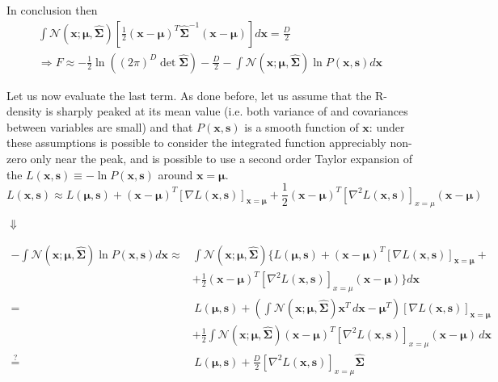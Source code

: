 \documentclass[a4paper, 10pt]{article}
\begin{document}
In conclusion then
\begin{gather}
\int \mathcal{N}(\mathbf x; \bm \mu, \bm{\hat{\Sigma}}) \left[ \frac{1}{2} (\mathbf x-\boldsymbol \mu)^T \boldsymbol{\hat{\Sigma}}^{-1} (\mathbf x-\boldsymbol \mu) \right] d \mathbf x = \frac{D}{2} \\
\Rightarrow F \approx -\frac{1}{2} \ln \left( (2 \pi)^{D} \det \bm{\hat{\Sigma}} \right) - \frac{D}{2} - \int \mathcal{N}(\mathbf x;\bm \mu,\bm{\hat{\Sigma}}) \ln P(\mathbf x,\mathbf s) d \mathbf x 
\end{gather}

Let us now evaluate the last term. As done before, let us assume that the R-density is sharply peaked at its mean value (i.e. both variance of and covariances between variables are small) and that $P(\mathbf x, \mathbf s)$ is a smooth function of $\mathbf x$: under these assumptions is possible to consider the integrated function appreciably non-zero only near the peak, and is possible to use a second order Taylor expansion of the $L(\mathbf x,\mathbf s) \equiv - \ln P(\mathbf x,\mathbf s)$ around $\mathbf x=\bm \mu$.
\begin{equation}
L(\mathbf x, \mathbf s) \approx L(\bm \mu, \mathbf s) +  (\mathbf x-\bm \mu)^T \left[ \nabla L(\mathbf x,\mathbf s) \right]_{\mathbf x=\bm \mu} + \frac{1}{2} (\mathbf x-\bm \mu)^T \left[ \nabla^2 L(\mathbf x, \mathbf s) \right]_{x=\mu} (\mathbf x-\bm \mu)
\end{equation}
\begin{center}
$\Downarrow$
\end{center}
\begin{equation}
\begin{split}
- \int \mathcal{N}(\mathbf x;\bm \mu,\bm{\hat{\Sigma}}) \ln P(\mathbf x,\mathbf s) d \mathbf x \approx & \int \mathcal{N}(\mathbf x;\bm \mu,\bm{\hat{\Sigma}}) \Big\lbrace L(\bm \mu, \mathbf s) +  (\mathbf x-\bm \mu)^T \left[ \nabla L(\mathbf x,\mathbf s) \right]_{\mathbf x=\bm \mu} + \\
	& + \frac{1}{2} (\mathbf x-\bm \mu)^T \left[ \nabla^2 L(\mathbf x, \mathbf s) \right]_{x=\mu} (\mathbf x-\bm \mu) \Big\rbrace d \mathbf x \\
	= & \, L(\bm \mu, \mathbf s) + \left( \int \mathcal{N}(\mathbf x; \bm \mu,\bm{\hat{\Sigma}}) \mathbf x^T \, d \mathbf x - \bm \mu^T \right) \left[ \nabla L(\mathbf x,\mathbf s) \right]_{\mathbf x=\bm \mu} \\
	& + \frac{1}{2} \int \mathcal{N}(\mathbf x;\bm \mu,\bm{\hat{\Sigma}}) (\mathbf x-\bm \mu)^T \left[ \nabla^2 L(\mathbf x, \mathbf s) \right]_{x=\mu} (\mathbf x-\bm \mu) \, d \mathbf x \\
\stackrel{?}{=} &\, L(\bm \mu,\mathbf s) + \frac{D}{2} \left[ \nabla^2 L(\mathbf x, \mathbf s) \right]_{x=\mu} \bm{\hat{\Sigma}}
\end{split}
\end{equation}
\end{document}
